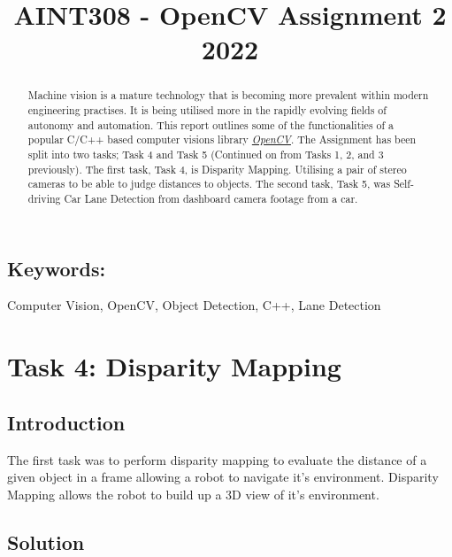 \documentclass[conference]{IEEEtran}
\begin{document}
\title{AINT308 - OpenCV Assignment 2 2022}

\author{
}

\maketitle

\begin{abstract}

Machine vision is a mature technology that is becoming more prevalent within modern engineering practises. It is being utilised more in the rapidly evolving fields of autonomy and automation. This report outlines some of the functionalities of a popular C/C++ based computer visions library \href{https://opencv.org}{\textit{OpenCV}}. The Assignment has been split into two tasks; Task 4 and Task 5 (Continued on from Tasks 1, 2, and 3 previously). The first task, Task 4, is Disparity Mapping. Utilising a pair of stereo cameras to be able to judge distances to objects. The second task, Task 5, was Self-driving Car Lane Detection from dashboard camera footage from a car.

\end{abstract}

\subsection*{Keywords:} 
Computer Vision, OpenCV, Object Detection, C++, Lane Detection

\section{Task 4: Disparity Mapping}	
\subsection{Introduction}

The first task was to perform disparity mapping to evaluate the distance of a given object in a frame allowing a robot to navigate it's environment. Disparity Mapping allows the robot to build up a 3D view of it's environment. 

\subsection{Solution}
\end{document}
